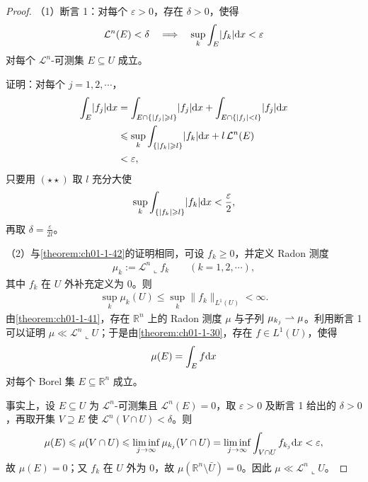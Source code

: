 \documentclass[../../main.tex]{subfiles}%
\begin{document}
\begin{proof}
（1）断言 1：对每个 $\varepsilon>0$，存在 $\delta>0$，使得
\begin{align*}
\mathcal{L}^n(E)<\delta\quad\Longrightarrow\quad\sup_k\int_E\lvert f_k\rvert\mathrm{d} x<\varepsilon
\end{align*}
对每个 $\mathcal{L}^n$-可测集 $E\subseteq U$ 成立。

证明：对每个 $j=1,2,\cdots$，
\begin{align*}
\int_E\lvert f_j\rvert\mathrm{d} x&=\int_{E\cap\{\lvert f_j\rvert\geqslant l\}}\lvert f_j\rvert\mathrm{d} x+\int_{E\cap\{\lvert f_j\rvert<l\}}\lvert f_j\rvert\mathrm{d} x\\
&\leqslant\sup_k\int_{\{\lvert f_k\rvert\geqslant l\}}\lvert f_k\rvert\mathrm{d} x+l\,\mathcal{L}^n(E)\\
&<\varepsilon,
\end{align*}
只要用 $(\star\star)$ 取 $l$ 充分大使
\begin{align*}
\sup_k\int_{\{\lvert f_k\rvert\geqslant l\}}\lvert f_k\rvert\mathrm{d} x<\frac{\varepsilon}{2},
\end{align*}
再取 $\delta=\frac{\varepsilon}{2l}$。

（2）与\cref{theorem:ch01-1-42}的证明相同，可设 $f_k\geqslant0$，并定义 Radon 测度%
\begin{align*}
\mu_k:=\mathcal{L}^n\llcorner f_k\qquad(k=1,2,\cdots),
\end{align*}
其中 $f_k$ 在 $U$ 外补充定义为 $0$。则
\begin{align*}
\sup_k\mu_k(U)\leqslant\sup_k\lVert f_k\rVert_{L^1(U)}<\infty .
\end{align*}
由\cref{theorem:ch01-1-41}，存在 $\mathbb{R}^n$ 上的 Radon 测度 $\mu$ 与子列 $\mu_{k_j}\rightharpoonup\mu$。利用断言 1 可以证明 $\mu\ll\mathcal{L}^n\llcorner U$；于是由\cref{theorem:ch01-1-30}，存在 $f\in L^1(U)$，使得%
\begin{align*}
\mu(E)=\int_Ef\mathrm{d} x
\end{align*}
对每个 Borel 集 $E\subseteq\mathbb{R}^n$ 成立。

事实上，设 $E\subseteq U$ 为 $\mathcal{L}^n$-可测集且 $\mathcal{L}^n(E)=0$，取 $\varepsilon>0$ 及断言 1 给出的 $\delta>0$，再取开集 $V\supseteq E$ 使 $\mathcal{L}^n(V\cap U)<\delta$。则
\begin{align*}
\mu(E)\leqslant\mu(V\cap U)\leqslant\liminf_{j\to\infty}\mu_{k_j}(V\cap U)=\liminf_{j\to\infty}\int_{V\cap U}f_{k_j}\mathrm{d} x<\varepsilon,
\end{align*}
故 $\mu(E)=0$；又 $f_k$ 在 $U$ 外为 $0$，故 $\mu(\mathbb{R}^n\setminus\bar U)=0$。因此 $\mu\ll\mathcal{L}^n\llcorner U$。


\end{proof}
\end{document}
